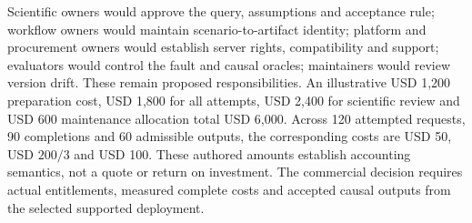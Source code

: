 Scientific owners would approve the query, assumptions and acceptance rule;
workflow owners would maintain scenario-to-artifact identity; platform and
procurement owners would establish server rights, compatibility and support;
evaluators would control the fault and causal oracles; maintainers would
review version drift. These remain proposed responsibilities. An illustrative
USD 1,200 preparation cost, USD 1,800 for all attempts, USD 2,400 for scientific
review and USD 600 maintenance allocation total USD 6,000. Across 120 attempted
requests, 90 completions and 60 admissible outputs, the corresponding costs
are USD 50, USD $200/3$ and USD 100. These authored amounts establish accounting
semantics, not a quote or return on investment. The commercial decision requires
actual entitlements, measured complete costs and accepted causal outputs from
the selected supported deployment.\citep{exec25_dataiku_choice}
